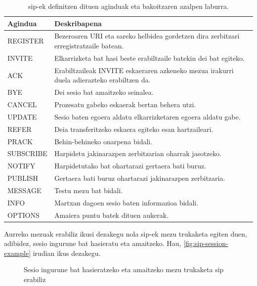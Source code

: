 \begin{table}[htb]
    \centering
    \resizebox{\textwidth}{!}
    {\begin{tabular}{
        >{\raggedright\arraybackslash}p{}
        >{\raggedright\arraybackslash}p{}
    }
        \toprule
        Agindua & Deskribapena \\
        \midrule
        REGISTER & Bezeroaren URI eta sareko helbidea gordetzen dira zerbitzari erregistratzaile batean. \\
        INVITE & Elkarrizketa bat hasi beste erabiltzaile batekin dei bat egiteko. \\
        ACK & Erabiltzaileak INVITE eskaeraren azkeneko mezua irakurri duela adierazteko erabiltzen da. \\
        BYE & Dei sesio bat amaitzeko seinalea. \\
        CANCEL & Prozesatu gabeko eskaerak bertan behera utzi. \\
        UPDATE & Sesio baten egoera aldatu elkarrizketaren egoera aldatu gabe. \\
        REFER & Deia transferitzeko eskaera egiteko esan hartzaileari. \\
        PRACK & Behin-behineko onarpena bidali. \\
        SUBSCRIBE & Harpidetu jakinarazpen zerbitzarian oharrak jasotzeko. \\
        NOTIFY & Harpidetutako bat ohartarazi gertaera bati buruz. \\
        PUBLISH & Gertaera bati buruz ohartarazi jakinarazpen zerbitzaria. \\
        MESSAGE & Testu mezu bat bidali. \\
        INFO & Martxan dagoen sesio baten informazioa bidali. \\
        OPTIONS & Amaiera puntu batek dituen aukerak. \\
        \bottomrule
    \end{tabular}}
    \caption{\gls{sip}-ek definitzen dituen aginduak eta bakoitzaren azalpen laburra.}
    \label{tbl:sip-aginduak}
\end{table}

Aurreko mezuak erabiliz ikusi dezakegu nola \gls{sip}-ek mezu trukaketa egiten duen, adibidez, sesio ingurune bat hasieratu eta amaitzeko. Hau, \autoref{fig:sip-session-example} irudian ikus dezakegu.

\begin{figure}[htbp]
    \centering
    
    \caption{Sesio ingurune bat hasieratzeko eta amaitzeko mezu trukaketa \gls{sip} erabiliz}
    \label{fig:sip-session-example}
\end{figure}

